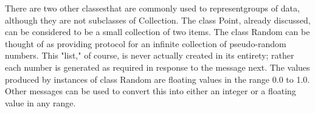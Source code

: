 There are two other classesthat are commonly used to representgroups
of data, although they are not subclasses of Collection. The class Point,
already discussed, can be considered to be a small collection of two items.
The class Random can be thought of as providing protocol for an infinite
collection of pseudo-random numbers. This "list," of course, is never actually created in its entirety; rather each number is generated as required
in response to the message next. The values produced by instances of class
Random are floating values in the range 0.0 to 1.0. Other messages can be
used to convert this into either an integer or a floating value in any range.
